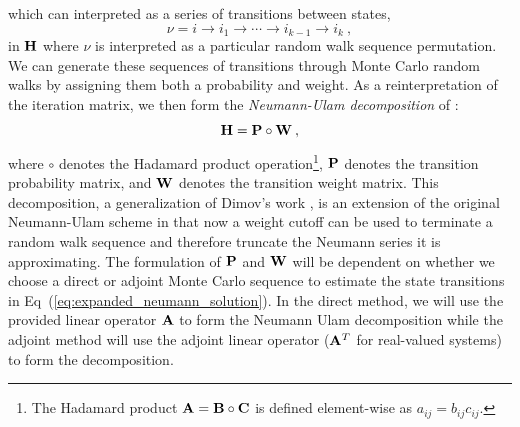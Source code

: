 which can interpreted as a series of transitions between states,
\begin{equation}
 \nu = i \rightarrow i_1 \rightarrow \cdots \rightarrow i_{k-1}
 \rightarrow i_{k}\:,
  \label{eq:mc_walk_permutation}
\end{equation}
in $\mathbf{H}$ where $\nu$ is interpreted as a particular random walk
sequence permutation. We can generate these sequences of transitions
through Monte Carlo random walks by assigning them both a probability
and weight. As a reinterpretation of the iteration matrix, we then
form the \textit{Neumann-Ulam decomposition} of :
\begin{equation}
  \mathbf{H} = \mathbf{P} \circ \mathbf{W}\:,
  \label{eq:neumann_ulam_decomposition}
\end{equation}
where $\circ$ denotes the Hadamard product operation\footnote{The
  Hadamard product $\mathbf{A} = \mathbf{B} \circ \mathbf{C}$ is defined
  element-wise as $a_{ij} = b_{ij} c_{ij}$.}, $\mathbf{P}$ denotes the
transition probability matrix, and $\mathbf{W}$ denotes the transition
weight matrix. This decomposition, a generalization of Dimov's work
\citep{dimov_new_1998}, is an extension of the original Neumann-Ulam
scheme in that now a weight cutoff can be used to terminate a random
walk sequence and therefore truncate the Neumann series it is
approximating. The formulation of $\mathbf{P}$ and $\mathbf{W}$ will be
dependent on whether we choose a direct or adjoint Monte Carlo
sequence to estimate the state transitions in
Eq~(\ref{eq:expanded_neumann_solution}). In the direct method, we will
use the provided linear operator $\mathbf{A}$ to form the Neumann Ulam
decomposition while the adjoint method will use the adjoint linear
operator ($\mathbf{A}^T$ for real-valued systems) to form the
decomposition.

